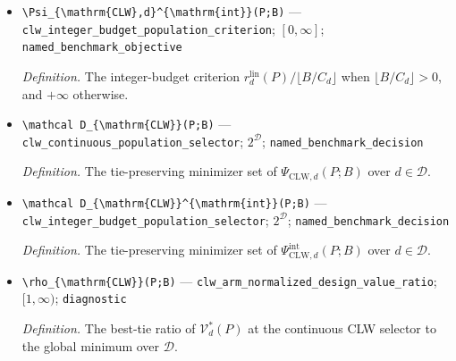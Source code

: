 \documentclass{article}
\begin{document}
\begin{itemize}
  \par\smallskip\noindent\emph{Definition.} On \(\mathfrak P_{\mathcal D}^{\mathrm{CLW}}\), the continuous named criterion \(\Psi_{\mathrm{CLW},d}(P;B)=r_d^{\mathrm{lin}}(P)/n_{\mathrm{CLW},B}(d)=C_dr_d^{\mathrm{lin}}(P)/B\).
  \item \texttt{\textbackslash{}\allowbreak{}Psi\_\allowbreak{}\{\textbackslash{}\allowbreak{}mathrm\{CLW\}\allowbreak{},\allowbreak{}d\}\allowbreak{}\textasciicircum{}\{\textbackslash{}\allowbreak{}mathrm\{int\}\allowbreak{}\}\allowbreak{}(P;\allowbreak{}B)} --- \texttt{clw\_\allowbreak{}integer\_\allowbreak{}budget\_\allowbreak{}population\_\allowbreak{}criterion}; \([0,\infty]\); \texttt{named\_\allowbreak{}benchmark\_\allowbreak{}objective}
  \par\smallskip\noindent\emph{Definition.} The integer-budget criterion \(r_d^{\mathrm{lin}}(P)/\lfloor B/C_d\rfloor\) when \(\lfloor B/C_d\rfloor>0\), and \(+\infty\) otherwise.
  \item \texttt{\textbackslash{}\allowbreak{}mathcal D\_\allowbreak{}\{\textbackslash{}\allowbreak{}mathrm\{CLW\}\allowbreak{}\}\allowbreak{}(P;\allowbreak{}B)} --- \texttt{clw\_\allowbreak{}continuous\_\allowbreak{}population\_\allowbreak{}selector}; \(2^{\mathcal D}\); \texttt{named\_\allowbreak{}benchmark\_\allowbreak{}decision}
  \par\smallskip\noindent\emph{Definition.} The tie-preserving minimizer set of \(\Psi_{\mathrm{CLW},d}(P;B)\) over \(d\in\mathcal D\).
  \item \texttt{\textbackslash{}\allowbreak{}mathcal D\_\allowbreak{}\{\textbackslash{}\allowbreak{}mathrm\{CLW\}\allowbreak{}\}\allowbreak{}\textasciicircum{}\{\textbackslash{}\allowbreak{}mathrm\{int\}\allowbreak{}\}\allowbreak{}(P;\allowbreak{}B)} --- \texttt{clw\_\allowbreak{}integer\_\allowbreak{}budget\_\allowbreak{}population\_\allowbreak{}selector}; \(2^{\mathcal D}\); \texttt{named\_\allowbreak{}benchmark\_\allowbreak{}decision}
  \par\smallskip\noindent\emph{Definition.} The tie-preserving minimizer set of \(\Psi_{\mathrm{CLW},d}^{\mathrm{int}}(P;B)\) over \(d\in\mathcal D\).
  \item \texttt{\textbackslash{}\allowbreak{}rho\_\allowbreak{}\{\textbackslash{}\allowbreak{}mathrm\{CLW\}\allowbreak{}\}\allowbreak{}(P;\allowbreak{}B)} --- \texttt{clw\_\allowbreak{}arm\_\allowbreak{}normalized\_\allowbreak{}design\_\allowbreak{}value\_\allowbreak{}ratio}; \([1,\infty)\); \texttt{diagnostic}
  \par\smallskip\noindent\emph{Definition.} The best-tie ratio of \(\mathcal V_d^*(P)\) at the continuous CLW selector to the global minimum over \(\mathcal D\).

\end{itemize}
\end{document}
